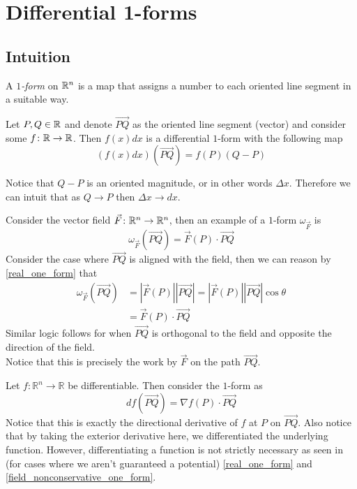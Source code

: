 \documentclass[notes.tex]{subfiles}
\begin{document}
\setcounter{section}{1}
\section{Differential 1-forms}

\subsection{Intuition}
\begin{definition}
    A \textit{$1$-form} on $\mathbb{R}^n$ is a map that assigns a number to each oriented line segment in a suitable way.
\end{definition}

\begin{example} \label{real_one_form}
    Let $P, Q \in \mathbb{R}$ and denote $\vec{PQ}$ as the oriented line segment (vector) and consider some $f\colon \mathbb{R} \to \mathbb{R}$. Then $f(x)dx$ is a differential $1$-form with the following map
    \[
        \left(f(x)dx\right)(\vec{PQ}) = f(P)(Q - P)
    \]
\end{example}
Notice that $Q - P$ is an oriented magnitude, or in other words $\Delta x$. Therefore we can intuit that as $Q \to P$ then $\Delta x \to dx$.

\begin{example} \label{field_nonconservative_one_form}
    Consider the vector field $\vec{F}\colon \mathbb{R}^n \to \mathbb{R}^n$, then an example of a $1$-form $\omega_{\vec{F}}$ is
    \[
        \omega_{\vec{F}}(\vec{PQ}) = \vec{F}(P)\cdot\vec{PQ}
    \]
    Consider the case where $\vec{PQ}$ is aligned with the field, then we can reason by \cref{real_one_form} that
    \begin{align*}
        \omega_{\vec{F}}(\vec{PQ})
        &= |\vec{F}(P)||\vec{PQ}|
        = |\vec{F}(P)||\vec{PQ}|\cos\theta \\
        &= \vec{F}(P)\cdot\vec{PQ}
    \end{align*}
    Similar logic follows for when $\vec{PQ}$ is orthogonal to the field and opposite the direction of the field. \\
    Notice that this is precisely the work by $\vec{F}$ on the path $\vec{PQ}$.
\end{example}

\begin{example} \label{field_conservative_one_form}
    Let $f\colon \mathbb{R}^n \to \mathbb{R}$ be differentiable. Then consider the $1$-form as
    \[
        df(\vec{PQ}) = \nabla f(P)\cdot\vec{PQ}
    \]
    Notice that this is exactly the directional derivative of $f$ at $P$ on $\vec{PQ}$. Also notice that by taking the exterior derivative here, we differentiated the underlying function. However, differentiating a function is not strictly necessary as seen in (for cases where we aren't guaranteed a potential) \cref{real_one_form} and \cref{field_nonconservative_one_form}.
\end{example}
\end{document}
